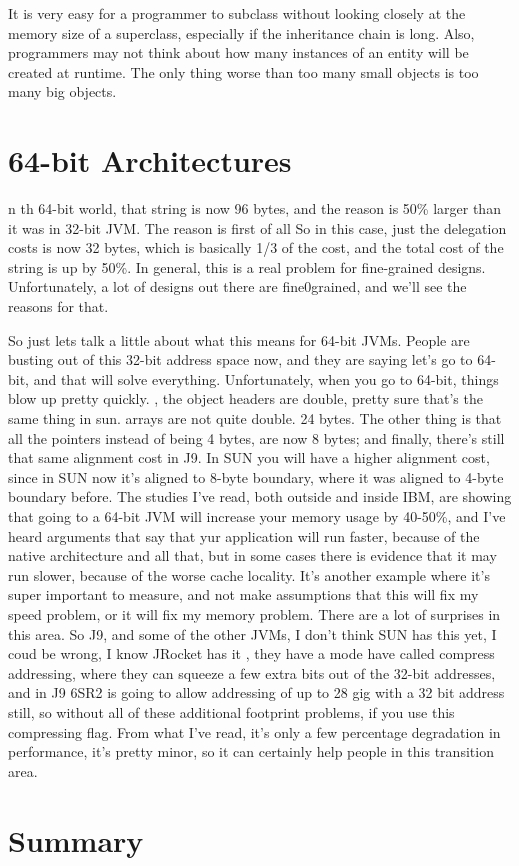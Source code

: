 It is very easy for a programmer to subclass without looking closely at the memory size of a superclass, especially if the inheritance chain is long. Also, programmers may not think about how many instances of an entity will be created at runtime. The only thing worse than too many small objects is too many big objects. 

\section{64-bit Architectures}

n th 64-bit world, that string is now 96 bytes, and the reason is 50\% larger than it was in 32-bit JVM. The reason is first of all So in this case, just the delegation costs is now 32 bytes, which is basically 1/3 of the cost, and the total cost of the string is up by 50\%.  In general, this is a real problem for fine-grained designs. Unfortunately, a lot of designs out there are fine0grained, and we'll see the reasons for that. 


So just lets talk a little about what this means for 64-bit JVMs. People are busting out of this 32-bit address space now, and they are saying let's go to 64-bit, and that will solve everything. Unfortunately, when you go to 64-bit, things blow up pretty quickly. , the object headers are double, pretty sure that's the same thing in sun. arrays are not quite double. 24 bytes. The other thing is that all the pointers instead of being 4 bytes, are now 8 bytes; and finally, there's still that same alignment cost in J9. In SUN you will have a higher alignment cost, since in SUN now it's aligned to 8-byte boundary, where it was aligned to 4-byte boundary before.  The studies I've read, both outside and inside IBM, are showing that going to a 64-bit JVM will increase your memory usage by 40-50\%, and I've heard arguments that say that yur application will run faster, because of the native architecture and all that,  but in some cases there is evidence that it may run slower, because of the worse cache locality. It's another example where it's super important to measure, and not make assumptions that this will fix my speed problem, or it will fix my memory problem. There are a lot of surprises in this area. So J9, and some of the other JVMs, I don't think SUN has this yet, I coud be wrong, I know JRocket has it , they have a mode have called compress addressing, where they can squeeze a few extra bits out of the 32-bit addresses, and in J9 6SR2 is going to allow addressing of up to 28 gig with a 32 bit address still, so without all of these additional footprint problems, if you use this compressing flag. From what I've read, it's only a few percentage degradation in performance, it's pretty minor, so it can certainly help people in this transition area.




\section{Summary}
